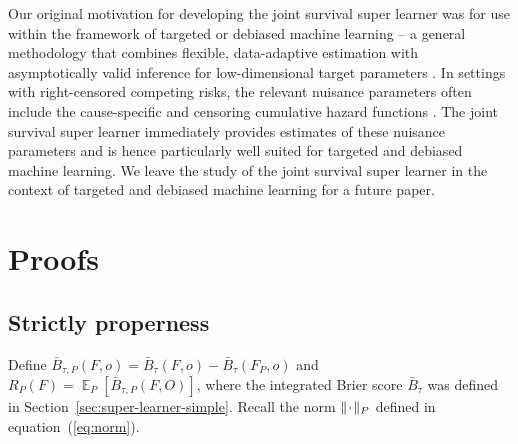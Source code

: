 \documentclass[a4paper,danish]{article}
\theoremstyle{plain} %
\numberwithin{theorem}{section}
\theoremstyle{definition} %
\theoremstyle{remark}
\DeclareMathOperator{\E}{\mathbb{E}} %
\newcommand{\blank}{\makebox[1ex]{\textbf{$\cdot$}}}
\newcommand{\1}{\mathds{1}}
\begin{document}
Our original motivation for developing the joint survival super
learner was for use within the framework of targeted or debiased
machine learning -- a general methodology that combines flexible,
data-adaptive estimation with asymptotically valid inference for
low-dimensional target parameters
\citep{van2011targeted,chernozhukov2018double}. In settings with
right-censored competing risks, the relevant nuisance parameters often
include the cause-specific and censoring cumulative hazard functions
\citep[e.g.,][]{van2003unified,rytgaard2022targeted}. The joint
survival super learner immediately provides estimates of these
nuisance parameters and is hence particularly well suited for targeted
and debiased machine learning. We leave the study of the joint
survival super learner in the context of targeted and debiased machine
learning for a future paper.





\appendix

\section{Proofs}
\label{sec:proofs}

\subsection{Strictly properness}
\label{sec:consistency-proof}

Define
\( \bar{B}_{\tau,P}(F, o) = \bar{B}_{\tau}(F, o) -
\bar{B}_{\tau}(F_P, o) \) and
\( R_{P}(F) = \E_P{[\bar{B}_{\tau,P}(F, O)]} \), where the
integrated Brier score \( \bar{B}_{\tau} \) was defined in
Section~\ref{sec:super-learner-simple}. Recall the norm
\( \Vert \blank \Vert_{P}\) defined in
equation~(\ref{eq:norm}).
\end{document}
